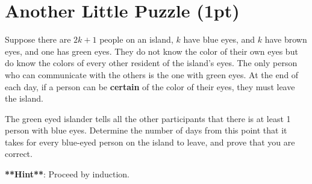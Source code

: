 \documentclass{exam}
\begin{document}
\section{Another Little Puzzle (1pt)}
Suppose there are $2k + 1$ people on an island, $k$ have blue eyes, and $k$ have brown eyes, and one has green eyes. They do not know the color of their own eyes but do know the colors of every other resident of the island's eyes. The only person who can communicate with the others is the one with green eyes. At the end of each day, if a person can be \textbf{certain} of the color of their eyes, they must leave the island. 

The green eyed islander tells all the other participants that there is at least 1 person with blue eyes. Determine the number of days from this point that it takes for every blue-eyed person on the island to leave, and prove that you are correct.

\textbf{**Hint**}: Proceed by induction.
\end{document}
